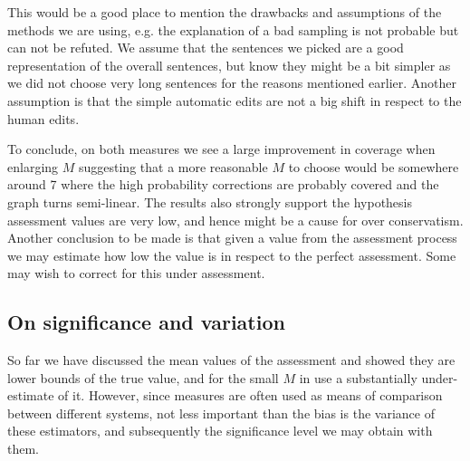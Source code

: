 		This would be a good place to mention the drawbacks and assumptions of the methods we are using, e.g. the explanation of a bad sampling is not probable but can not be refuted. We assume that the sentences we picked are a good representation of the overall sentences, but know they might be a bit simpler as we did not choose very long sentences for the reasons mentioned earlier. Another assumption is that the simple automatic edits are not a big shift in respect to the human edits.
		
		
		To conclude, on both measures we see a large improvement in coverage when enlarging $M$ suggesting that a more reasonable $M$ to choose would be somewhere around 7 where the high probability corrections are probably covered and the graph turns semi-linear. The results also strongly support the hypothesis assessment values are very low, and hence might be a cause for over conservatism.
		Another conclusion to be made is that given a value from the assessment process we may estimate how low the value is in respect to the perfect assessment. Some may wish to correct for this under assessment.
		
		\subsection{On significance and variation}
		
		
		
		So far we have discussed the mean values of the assessment and showed they are lower bounds of the true value, and for the small $M$ in use a substantially under-estimate of it. However, since measures are often used as means of comparison between different systems, not less important than the bias is the variance of these estimators, and subsequently the significance level we may obtain with them. 
		
